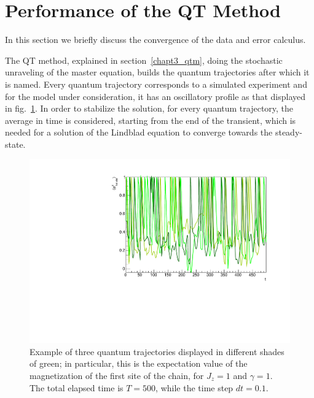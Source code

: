 \section{Performance of the QT Method}
In this section we briefly discuss the convergence of the data and error calculus.

The QT method, explained in section~\ref{chapt3_qtm}, doing the stochastic unraveling of the master equation, builds the quantum trajectories after which it is named.  Every quantum trajectory corresponds to a simulated experiment and for the model under consideration, it has an oscillatory profile as that displayed in fig.~\ref{fig:QTrajectories3}. In order to stabilize the solution, for every quantum trajectory, the average in time is considered, starting from the end of the transient, which is needed for a solution of the Lindblad equation to converge towards the steady-state.

\begin{figure}[H]
    \centering
    \includegraphics[scale=0.6]{Figures/QTrajectories3.pdf}
    \captionsetup{width=1.\linewidth}
    \caption{Example of three quantum trajectories displayed in different shades of green; in particular, this is the expectation value of the magnetization of the first site of the chain, for $J_z = 1$ and $\gamma = 1$. The total elapsed time is $T=500$, while the time step $dt = 0.1$.}
    \label{fig:QTrajectories3}
\end{figure}

